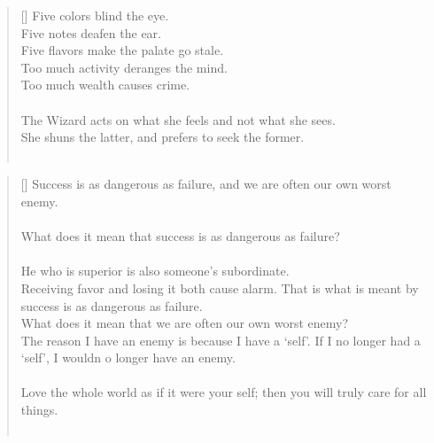 \documentclass{article}
\begin{document}
\settowidth{\versewidth}{The Wizard leads byemptying people’s minds, filling their bellies, weakening their am- bitions, and making them become strong}
\begin{verse}[\versewidth]
Five colors blind the eye.\\
Five notes deafen the ear.\\
Five flavors make the palate go stale.\\
Too much activity deranges the mind.\\
Too much wealth causes crime.\\
\hfill\\
The Wizard acts on what she feels and not what she sees.\\
She shuns the latter, and prefers to seek the former.\\
\hfill\\
\end{verse}

\settowidth{\versewidth}{The Wizard leads byemptying people’s minds, filling their bellies, weakening their am- bitions, and making them become strong}
\begin{verse}[\versewidth]
Success is as dangerous as failure, and we are often our own worst enemy.\\
\hfill\\
What does it mean that success is as dangerous as failure?\\
\hfill\\
He who is superior is also someone's subordinate.\\
Receiving favor and losing it both cause alarm. That is what is meant by success is as dangerous as failure.\\
What does it mean that we are often our own worst enemy?\\
The reason I have an enemy is because I have a `self'. If I no longer had a `self', I wouldn o longer have an enemy.\\
\hfill\\
Love the whole world as if it were your self; then you will truly care for all things.\\
\hfill\\
\end{verse}
\end{document}
